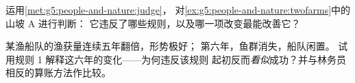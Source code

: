 \begin{exercise}[$\star\star$]\label{exo:g5:people-and-nature:10}
运用\cref{met:g5:people-and-nature:judge}，
对\cref{ex:g5:people-and-nature:twofarms}中的山坡 A 进行判断：
它违反了哪些规则，以及哪一项改变最能改善它？
\end{exercise}

\begin{exercise}[$\star\star\star$]\label{exo:g5:people-and-nature:11}
某渔船队的渔获量连续五年翻倍，形势极好；
第六年，鱼群消失，船队闲置。
试用规则 1 解释这六年的变化——为何违反该规则
起初反而\emph{看似}成功？并与林务员
相反的算账方法作比较。
\end{exercise}
